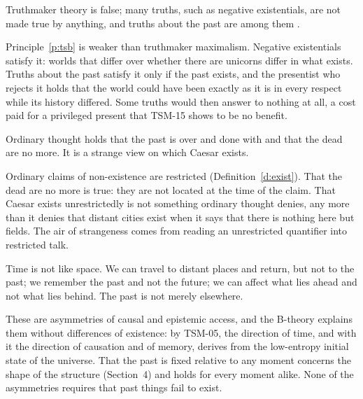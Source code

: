 \documentclass{situationist-preprint}
\begin{document}
\begin{objection}\label{o:merricks}
Truthmaker theory is false; many truths, such as negative existentials, are not made true by anything, and truths about the past are among them \citep{Merricks2007}.
\end{objection}

\begin{reply}
Principle~\ref{p:tsb} is weaker than truthmaker maximalism. Negative existentials satisfy it: worlds that differ over whether there are unicorns differ in what exists. Truths about the past satisfy it only if the past exists, and the presentist who rejects it holds that the world could have been exactly as it is in every respect while its history differed. Some truths would then answer to nothing at all, a cost paid for a privileged present that TSM-15 shows to be no benefit.
\end{reply}

\begin{objection}\label{o:gone}
Ordinary thought holds that the past is over and done with and that the dead are no more. It is a strange view on which Caesar exists.
\end{objection}

\begin{reply}
Ordinary claims of non-existence are restricted (Definition~\ref{d:exist}). That the dead are no more is true: they are not located at the time of the claim. That Caesar exists unrestrictedly is not something ordinary thought denies, any more than it denies that distant cities exist when it says that there is nothing here but fields. The air of strangeness comes from reading an unrestricted quantifier into restricted talk.
\end{reply}

\begin{objection}[Disanalogy]\label{o:dis}
Time is not like space. We can travel to distant places and return, but not to the past; we remember the past and not the future; we can affect what lies ahead and not what lies behind. The past is not merely elsewhere.
\end{objection}

\begin{reply}
These are asymmetries of causal and epistemic access, and the B-theory explains them without differences of existence: by TSM-05, the direction of time, and with it the direction of causation and of memory, derives from the low-entropy initial state of the universe. That the past is fixed relative to any moment concerns the shape of the structure (Section~4) and holds for every moment alike. None of the asymmetries requires that past things fail to exist.
\end{reply}
\end{document}
